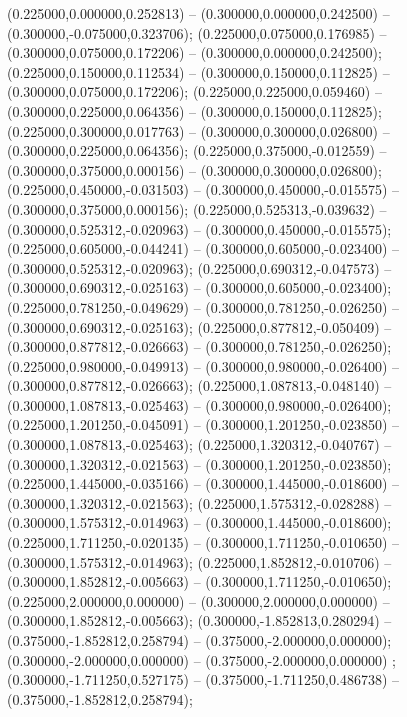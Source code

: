  (0.225000,0.000000,0.252813) -- (0.300000,0.000000,0.242500) -- (0.300000,-0.075000,0.323706);
 (0.225000,0.075000,0.176985) -- (0.300000,0.075000,0.172206) -- (0.300000,0.000000,0.242500);
 (0.225000,0.150000,0.112534) -- (0.300000,0.150000,0.112825) -- (0.300000,0.075000,0.172206);
 (0.225000,0.225000,0.059460) -- (0.300000,0.225000,0.064356) -- (0.300000,0.150000,0.112825);
 (0.225000,0.300000,0.017763) -- (0.300000,0.300000,0.026800) -- (0.300000,0.225000,0.064356);
 (0.225000,0.375000,-0.012559) -- (0.300000,0.375000,0.000156) -- (0.300000,0.300000,0.026800);
 (0.225000,0.450000,-0.031503) -- (0.300000,0.450000,-0.015575) -- (0.300000,0.375000,0.000156);
 (0.225000,0.525313,-0.039632) -- (0.300000,0.525312,-0.020963) -- (0.300000,0.450000,-0.015575);
 (0.225000,0.605000,-0.044241) -- (0.300000,0.605000,-0.023400) -- (0.300000,0.525312,-0.020963);
 (0.225000,0.690312,-0.047573) -- (0.300000,0.690312,-0.025163) -- (0.300000,0.605000,-0.023400);
 (0.225000,0.781250,-0.049629) -- (0.300000,0.781250,-0.026250) -- (0.300000,0.690312,-0.025163);
 (0.225000,0.877812,-0.050409) -- (0.300000,0.877812,-0.026663) -- (0.300000,0.781250,-0.026250);
 (0.225000,0.980000,-0.049913) -- (0.300000,0.980000,-0.026400) -- (0.300000,0.877812,-0.026663);
 (0.225000,1.087813,-0.048140) -- (0.300000,1.087813,-0.025463) -- (0.300000,0.980000,-0.026400);
 (0.225000,1.201250,-0.045091) -- (0.300000,1.201250,-0.023850) -- (0.300000,1.087813,-0.025463);
 (0.225000,1.320312,-0.040767) -- (0.300000,1.320312,-0.021563) -- (0.300000,1.201250,-0.023850);
 (0.225000,1.445000,-0.035166) -- (0.300000,1.445000,-0.018600) -- (0.300000,1.320312,-0.021563);
 (0.225000,1.575312,-0.028288) -- (0.300000,1.575312,-0.014963) -- (0.300000,1.445000,-0.018600);
 (0.225000,1.711250,-0.020135) -- (0.300000,1.711250,-0.010650) -- (0.300000,1.575312,-0.014963);
 (0.225000,1.852812,-0.010706) -- (0.300000,1.852812,-0.005663) -- (0.300000,1.711250,-0.010650);
 (0.225000,2.000000,0.000000) -- (0.300000,2.000000,0.000000) -- (0.300000,1.852812,-0.005663);
 (0.300000,-1.852813,0.280294) -- (0.375000,-1.852812,0.258794) -- (0.375000,-2.000000,0.000000);
 (0.300000,-2.000000,0.000000) -- (0.375000,-2.000000,0.000000) ;
 (0.300000,-1.711250,0.527175) -- (0.375000,-1.711250,0.486738) -- (0.375000,-1.852812,0.258794);
